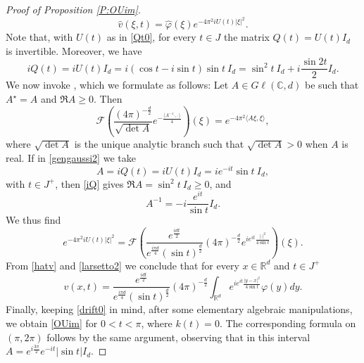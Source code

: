 \documentclass[11pt,a4paper]{amsart}
\def \vf{\varphi}
\newcommand{\Rm}{\mathbb R^d}
\numberwithin{equation}{section}
\newcommand{\sa}{\langle}
\newcommand{\da}{\rangle}
\numberwithin{equation}{section}
\begin{document}
\begin{proof}[Proof of Proposition \ref{P:OUim}]
\begin{equation}
\hat v(\xi,t) = \hat \vf(\xi) e^{-4\pi^2 i U(t) |\xi|^2}.
\end{equation} 
Note that, with $U(t)$ as in \eqref{Qt0}, for every $t\in J$ the matrix $Q(t) = U(t) I_d$ is invertible. Moreover, we have
\begin{equation}\label{iQ}
i Q(t) = i U(t) I_d = i(\cos t - i \sin t) \sin t\ I_d = \sin^2 t\ I_d + i \frac{\sin{2t}}2 I_d. 
\end{equation}
We now invoke \cite[Theorem 7.6.1]{Hobook}, which we formulate as follows: Let $A\in G\ell(\mathbb C,d)$ be such that $A^\star = A$ and $\Re A \ge 0$. Then 
\begin{equation}\label{gengaussi2}
\mathscr F\left(\frac{(4\pi)^{-\frac{d}{2}}}{\sqrt{\operatorname{det} A}} e^{- \frac{\sa A^{-1}\cdot,\cdot\da}{4}}\right)(\xi) =
e^{- 4 \pi^2  \sa A\xi,\xi\da},
\end{equation}
where $\sqrt{\operatorname{det} A}$ is the unique analytic branch such that $\sqrt{\operatorname{det} A}>0$ when $A$ is real. 
If in \eqref{gengaussi2} we take 
\[
A = i Q(t) = i U(t) I_d =  i e^{-it} \sin t\ I_d,
\]
with  $t\in J^+$, then \eqref{iQ} gives $\Re A = \sin^2 t\ I_d \ge 0$, and
\[
A^{-1} = - i  \frac{e^{it}}{\sin t} I_d.
\]
We thus find 
\begin{equation}\label{larsetto2}
e^{-4\pi^2 i U(t) |\xi|^2}  = \mathscr F\left(\frac{e^{\frac{idt}2}}{e^{\frac{i\pi d}{4}} (\sin t)^{\frac d2}}(4\pi
)^{-\frac{d}{2}} e^{i e^{it}\frac{|\cdot|^2}{4 \sin t}}\right)(\xi).
\end{equation}
From \eqref{hatv} and \eqref{larsetto2} we conclude that for every $x\in \Rm$ and $t\in J^+$
\begin{equation}\label{hatv2}
v(x,t) = \frac{e^{\frac{idt}2}}{e^{\frac{i\pi d}{4}} (\sin t)^{\frac d2}}(4\pi
)^{-\frac{d}{2}} \int_{\Rm} e^{i e^{it}\frac{|y-x|^2}{4 \sin t}} \vf(y) dy.
\end{equation} 
Finally, keeping \eqref{drift0} in mind, after some elementary algebraic manipulations, we obtain \eqref{OUim} for $0<t<\pi$, where $k(t)=0$. The corresponding formula on $(\pi,2\pi)$ follows by the same argument, observing that in this interval $A=e^{i\frac{3\pi}{2}}e^{-it}|\sin t|I_d$.


\end{proof}
\end{document}
